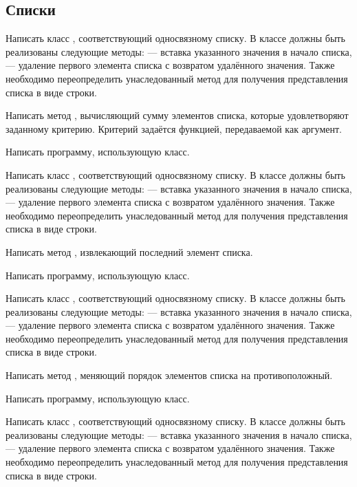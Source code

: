 
\subsection{Списки}

\task Написать класс , соответствующий
односвязному списку. В классе должны быть реализованы следующие
методы:  — вставка указанного значения в начало списка,
 — удаление первого элемента списка с возвратом удалённого
значения.  Также необходимо переопределить унаследованный метод
 для получения представления списка в виде строки.

Написать метод , вычисляющий сумму элементов списка, которые
удовлетворяют заданному критерию. Критерий задаётся функцией,
передаваемой как аргумент.

Написать программу, использующую класс.

\task Написать класс , соответствующий
односвязному списку. В классе должны быть реализованы следующие
методы:  — вставка указанного значения в начало списка,
 — удаление первого элемента списка с возвратом удалённого
значения.  Также необходимо переопределить унаследованный метод
 для получения представления списка в виде строки.

Написать метод , извлекающий последний элемент списка.

Написать программу, использующую класс.

\task Написать класс , соответствующий
односвязному списку. В классе должны быть реализованы следующие
методы:  — вставка указанного значения в начало списка,
 — удаление первого элемента списка с возвратом удалённого
значения.  Также необходимо переопределить унаследованный метод
 для получения представления списка в виде строки.

Написать метод , меняющий порядок элементов списка на
противоположный.

Написать программу, использующую класс.

\task Написать класс , соответствующий
односвязному списку. В классе должны быть реализованы следующие
методы:  — вставка указанного значения в начало списка,
 — удаление первого элемента списка с возвратом удалённого
значения.  Также необходимо переопределить унаследованный метод
 для получения представления списка в виде строки.

